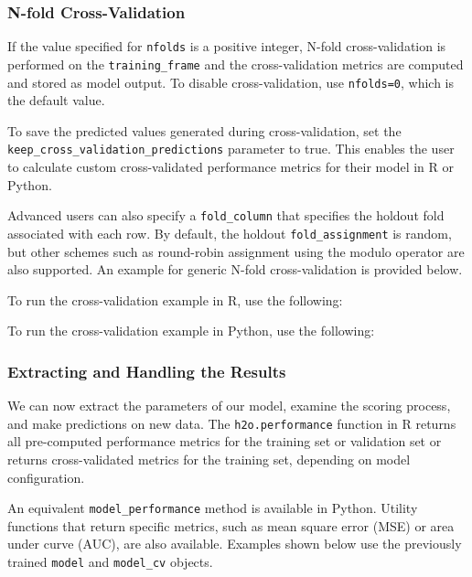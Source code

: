 {{\subsubsection{N-fold Cross-Validation} 

If the value specified for \texttt{nfolds} is a positive integer, N-fold cross-validation is performed on the \texttt{training\_frame} and the cross-validation metrics are computed and stored as model output.  To disable cross-validation, use \texttt{nfolds=0}, which is the default value.  

To save the predicted values generated during cross-validation, set the\\ \texttt{keep\_cross\_validation\_predictions} parameter to true.  This enables the user to calculate custom cross-validated performance metrics for their model in R or Python.  

Advanced users can also specify a \texttt{fold\_column} that specifies the holdout fold associated with each row. By default, the holdout \texttt{fold\_assignment} is random, but other schemes such as round-robin assignment using the modulo operator are also supported. An example for generic N-fold cross-validation is provided below.  

\waterExampleInR
To run the cross-validation example in R, use the following: 


\waterExampleInPython
To run the cross-validation example in Python, use the following: 


\subsubsection{Extracting and Handling the Results} 

We can now extract the parameters of our model, examine the scoring process, and make predictions on new data.  The \texttt{h2o.performance} function in R returns all pre-computed performance metrics for the training set or validation set or returns cross-validated metrics for the training set, depending on model configuration. 

An equivalent \texttt{model\_performance} method is available in Python.  Utility functions that return specific metrics, such as mean square error (MSE) or area under curve (AUC), are also available.  Examples shown below use the previously trained \texttt{model} and \texttt{model\_cv} objects.

}}
